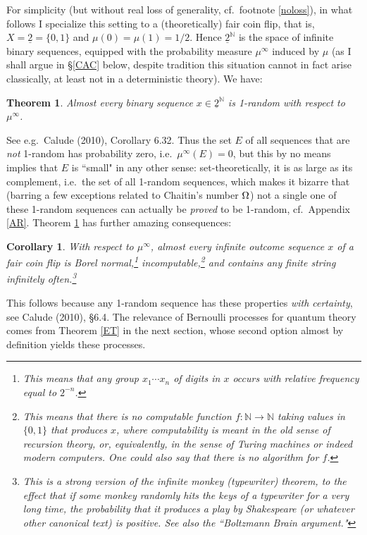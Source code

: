 \documentclass[11pt,a4paper]{article}
\numberwithin{equation}{section}
\newcommand{\ul}{\underline}
\newcommand{\raw}{\rightarrow}
\newcommand{\N}{{\mathbb N}} \newcommand{\R}{{\mathbb R}}
\newtheorem{theorem}[definition]{Theorem}
\newtheorem{corollary}[definition]{Corollary}
\begin{document}
For simplicity (but without real loss of generality, cf.\  footnote \ref{noloss}), in what follows I specialize this setting to a (theoretically) fair coin flip, that is, $X=\ul{2}=\{0,1\}$ and $\mu(0)=\mu(1)=1/2$. Hence $\ul{2}^{\N}$ is the space of infinite binary sequences, equipped with the probability measure $\mu^{\infty}$ induced by $\mu$ (as I shall argue in \S\ref{CAC} below, despite tradition this situation cannot in fact arise classically, at least not in a deterministic theory). We have:
 \begin{theorem}\label{thm:3.1}
 Almost every binary sequence $x\in\ul{2}^{\N}$ is 1-random with respect to $\mu^{\infty}$.
  \end{theorem}
 See e.g.\ Calude (2010), Corollary 6.32. Thus the set $E$ of all sequences that are \emph{not} 1-random has probability zero, i.e.\ $\mu^{\infty}(E)=0$, but this by no means implies that $E$ is ``small" in any other sense: set-theoretically, it is as large as its complement, i.e.\ the set of all 1-random sequences, which makes it bizarre that (barring a few exceptions related to Chaitin's number $\Omega$) not a single one of these  1-random sequences can actually be \emph{proved} to be 1-random, cf.\ Appendix \ref{AR}. Theorem \ref{thm:3.1} has further amazing consequences:
  \begin{corollary}\label{CC}
 With respect to $\mu^{\infty}$, almost every infinite outcome sequence $x$ of a  fair coin flip
 is Borel normal,\footnote{This means that any group $x_1 \cdots x_n$ of digits in $x$ occurs with relative frequency equal to $2^{-n}$. }
 incomputable,\footnote{This means that there is no computable function $f:\N\raw\N$ taking values in $\{0,1\}$ that produces $x$, where computability is meant in the old sense of recursion theory, or, equivalently, in the sense of Turing machines or indeed modern computers. One could also say that there is no algorithm for $f$.} 
  and contains any finite string infinitely often.\footnote{This is a strong version of the \emph{infinite monkey (typewriter) theorem}, to the effect that if some monkey randomly hits the keys of a typewriter for a very long time, the probability that it produces a play by Shakespeare (or whatever other canonical text) is positive. See also the ``Boltzmann Brain argument." }
 \end{corollary}
 This follows because any 1-random sequence has these properties \emph{with certainty}, see Calude (2010), \S 6.4. 
 The relevance of Bernoulli processes for quantum theory comes from Theorem \ref{ET} in the next section, whose second option almost by definition yields these processes.
\end{document}
